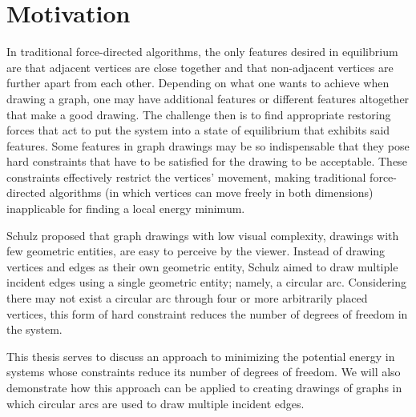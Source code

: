 \section{Motivation}
\label{sect:motivation}

In traditional force-directed algorithms, the only features desired in equilibrium are that adjacent vertices are close together and that non-adjacent vertices are further apart from each other. Depending on what one wants to achieve when drawing a graph, one may have additional features \emdash or different features altogether \emdash that make a good drawing. The challenge then is to find appropriate restoring forces that act to put the system into a state of equilibrium that exhibits said features. Some features in graph drawings may be so indispensable that they pose hard constraints that have to be satisfied for the drawing to be acceptable. These constraints effectively restrict the vertices' movement, making traditional force-directed algorithms (in which vertices can move freely in both dimensions) inapplicable for finding a local energy minimum.

Schulz \cite{Schulz} proposed that graph drawings with low visual complexity, \ie{} drawings with few geometric entities, are easy to perceive by the viewer. Instead of drawing vertices and edges as their own geometric entity, Schulz aimed to draw multiple incident edges using a single geometric entity; namely, a circular arc. Considering there may not exist a circular arc through four or more arbitrarily placed vertices, this form of hard constraint reduces the number of degrees of freedom in the system.

This thesis serves to discuss an approach to minimizing the potential energy in systems whose constraints reduce its number of degrees of freedom. We will also demonstrate how this approach can be applied to creating drawings of graphs in which circular arcs are used to draw multiple incident edges.
